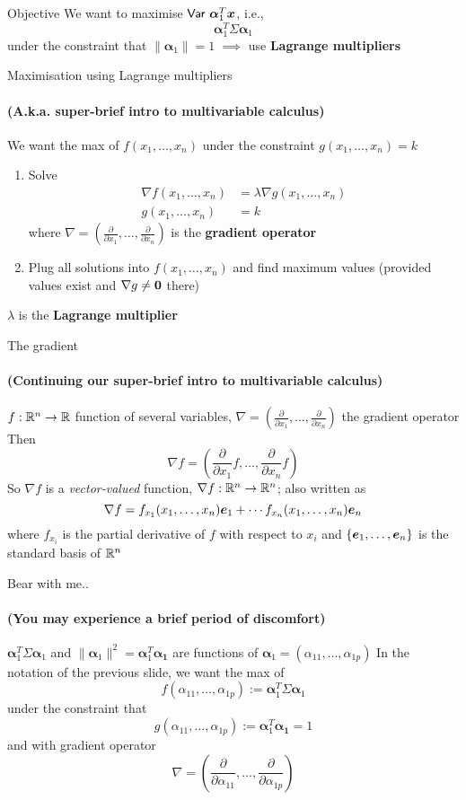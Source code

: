 \documentclass[aspectratio=169]{beamer}\usepackage[]{graphicx}\usepackage[]{xcolor}
\begin{document}
\begin{frame}{Objective}
We want to maximise $\mathsf{Var}\  \bm{\alpha}_1^T\bm{x}$, i.e.,
\[
\bm{\alpha}_1^T\Sigma\bm{\alpha}_1
\]
under the constraint that $\|\bm{\alpha}_1\|=1$
\vfill
$\implies$ use \textbf{Lagrange multipliers}
\end{frame}


\begin{frame}{Maximisation using Lagrange multipliers}
\framesubtitle{(A.k.a. super-brief intro to multivariable calculus)}
We want the max of $f(x_1,\ldots,x_n)$ under the constraint $g(x_1,\ldots,x_n)=k$
\begin{enumerate}
\item Solve
\begin{align*}
\nabla f(x_1,\ldots,x_n) &= \lambda\nabla g(x_1,\ldots,x_n) \\
g(x_1,\ldots,x_n) &= k
\end{align*}
where $\nabla=(\frac{\partial}{\partial x_1},\ldots,\frac{\partial}{\partial x_n})$ is the \textbf{gradient operator}
\item Plug all solutions into $f(x_1,\ldots,x_n)$ and find maximum values (provided values exist and $\nabla g\neq \b0$ there)
\end{enumerate}
\vfill
$\lambda$ is the \textbf{Lagrange multiplier}
\end{frame}


\begin{frame}{The gradient}
\framesubtitle{(Continuing our super-brief intro to multivariable calculus)}
$f:\mathbb{R}^n\to\mathbb{R}$ function of several variables, $\nabla=\left(\frac{\partial}{\partial x_1},\ldots,\frac{\partial}{\partial x_n}\right)$ the gradient operator
\vfill
Then
\[
\nabla f = \left(
\frac{\partial}{\partial x_1}f,\ldots,
\frac{\partial}{\partial x_n}f
\right)
\]
\vfill
So $\nabla f$ is a \emph{vector-valued} function, $\nabla f:\mathbb{R}^n\to\mathbb{R}^n$; also written as
\[
\nabla f = f_{x_1}(x_1,\ldots,x_n)\bm{e}_1+\cdots f_{x_n}(x_1,\ldots,x_n)\bm{e}_n
\]
where $f_{x_i}$ is the partial derivative of $f$ with respect to $x_i$ and $\{\bm{e}_1,\ldots,\bm{e}_n\}$ is the standard basis of $\mathbb{R}^n$
\end{frame}


\begin{frame}{Bear with me..}
\framesubtitle{(You may experience a brief period of discomfort)}
$\bm{\alpha}_1^T\Sigma\bm{\alpha}_1$ and $\|\bm{\alpha}_1\|^2=\bm{\alpha}_1^T\bm{\alpha_1}$ are functions of $\bm{\alpha}_1=(\alpha_{11},\ldots,\alpha_{1p})$
\vfill
In the notation of the previous slide, we want the max of 
\[
f(\alpha_{11},\ldots,\alpha_{1p}) := \bm{\alpha}_1^T\Sigma\bm{\alpha}_1
\]
under the constraint that
\[
g(\alpha_{11},\ldots,\alpha_{1p}) := \bm{\alpha}_1^T\bm{\alpha_1} = 1
\]
and with gradient operator
\[
\nabla = \left(
\frac{\partial}{\partial \alpha_{11}},
\ldots,
\frac{\partial}{\partial \alpha_{1p}}
\right)
\]
\end{frame}
\end{document}

